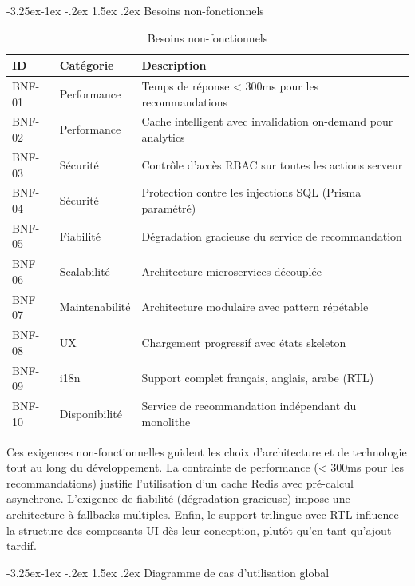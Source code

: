 \documentclass[12pt,a4paper,openany]{report}
\makeatletter
\renewcommand\subsection{\@startsection{subsection}{2}{\z@}%
  {-3.25ex\@plus -1ex \@minus -.2ex}%
  {1.5ex \@plus .2ex}%
  {\needspace{8\baselineskip}\normalfont\large\bfseries\color{primary!80!black}}}
\makeatother
\begin{document}
\subsection{Besoins non-fonctionnels}

\begin{table}[H]
\centering
{}
\begin{tabularx}{\textwidth}{llX}
\toprule
\rowcolor{headerblue!20}
\textbf{ID} & \textbf{Catégorie} & \textbf{Description} \\
\midrule
BNF-01 & Performance & Temps de réponse < 300ms pour les recommandations \\
BNF-02 & Performance & Cache intelligent avec invalidation on-demand pour analytics \\
BNF-03 & Sécurité & Contrôle d'accès RBAC sur toutes les actions serveur \\
BNF-04 & Sécurité & Protection contre les injections SQL (Prisma paramétré) \\
BNF-05 & Fiabilité & Dégradation gracieuse du service de recommandation \\
BNF-06 & Scalabilité & Architecture microservices découplée \\
BNF-07 & Maintenabilité & Architecture modulaire avec pattern répétable \\
BNF-08 & UX & Chargement progressif avec états skeleton \\
BNF-09 & i18n & Support complet français, anglais, arabe (RTL) \\
BNF-10 & Disponibilité & Service de recommandation indépendant du monolithe \\
\bottomrule
\end{tabularx}
\caption{Besoins non-fonctionnels}
\end{table}

Ces exigences non-fonctionnelles guident les choix d'architecture et de technologie tout au long du développement. La contrainte de performance (< 300ms pour les recommandations) justifie l'utilisation d'un cache Redis avec pré-calcul asynchrone. L'exigence de fiabilité (dégradation gracieuse) impose une architecture à fallbacks multiples. Enfin, le support trilingue avec RTL influence la structure des composants UI dès leur conception, plutôt qu'en tant qu'ajout tardif.

\subsection{Diagramme de cas d'utilisation global}
\end{document}

